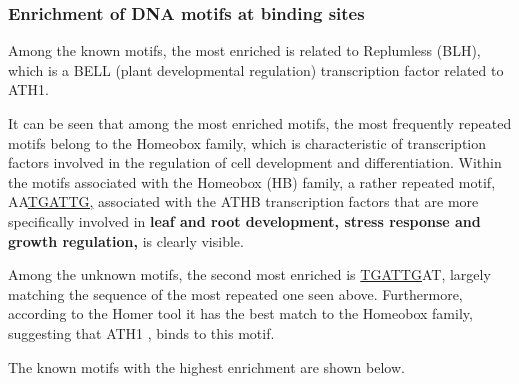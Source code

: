 \documentclass[
]{article}
\begin{document}
\hypertarget{enrichment-of-dna-motifs-at-binding-sites}{%
\subsubsection{Enrichment of DNA motifs at binding
sites}\label{enrichment-of-dna-motifs-at-binding-sites}}

Among the known motifs, the most enriched is related to Replumless
(BLH), which is a BELL (plant developmental regulation) transcription
factor related to ATH1.

It can be seen that among the most enriched motifs, the most frequently
repeated motifs belong to the Homeobox family, which is characteristic
of transcription factors involved in the regulation of cell development
and differentiation. Within the motifs associated with the Homeobox (HB)
family, a rather repeated motif, AA\ul{TGATTG,} associated with the ATHB
transcription factors that are more specifically involved in
\textbf{leaf and root development, stress response and growth
regulation,} is clearly visible.

Among the unknown motifs, the second most enriched is \ul{TGATTG}AT,
largely matching the sequence of the most repeated one seen above.
Furthermore, according to the Homer tool it has the best match to the
Homeobox family, suggesting that ATH1 , binds to this motif.

The known motifs with the highest enrichment are shown below.
\end{document}
